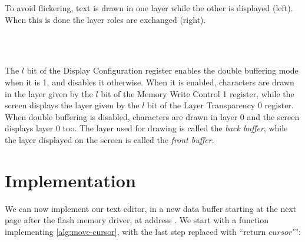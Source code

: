 \begin{Figure}
  

  \caption{To avoid flickering, text is drawn in one layer while the other is
  displayed (left). When this is done the layer roles are exchanged
  (right).}\label{fig:double-buffering}
\end{Figure}

\begin{Paragraph}
\\
\\
\end{Paragraph}

The $l$ bit of the Display Configuration register enables the double buffering
mode when it is 1, and disables it otherwise. When it is enabled, characters
are drawn in the layer given by the $l$ bit of the Memory Write Control 1
register, while the screen displays the layer given by the $l$ bit of the Layer
Transparency 0 register. When double buffering is disabled, characters are
drawn in layer 0 and the screen displays layer 0 too. The layer used for
drawing is called the {\em back buffer}, while the layer displayed on the
screen is called the {\em front buffer}.

\section{Implementation}\label{section:ted-implementation}


We can now implement our text editor, in a new data buffer starting at the next
page after the flash memory driver, at address . We
start with a function implementing \cref{alg:move-cursor}, with the last step
replaced with ``return $cursor'$'':\bigskip

\vspace{-0.9\baselineskip}
\begin{TwoColumns}
\end{TwoColumns}

